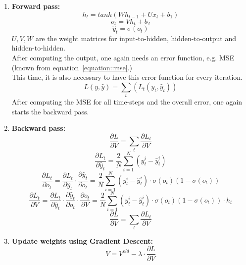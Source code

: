   \begin{enumerate}
   \item \textbf{Forward pass:}
   \begin{equation}
    h_t = tanh(Wh_{t-1} + Ux_t + b_1)
   \end{equation}
   \begin{equation}
    o_t = Vh_t + b_2
   \end{equation}
   \begin{equation}
    \hat{y}_t = \sigma(o_t)
   \end{equation}
   $U,V,W$ are the weight matrices for input-to-hidden, hidden-to-output and hidden-to-hidden.\\
   After computing the output, one again needs an error function, e.g. MSE (known from equation~\ref{equation::mse}.)\\
   This time, it is also necessary to have this error function for every iteration.
   \begin{equation}
    L(y, \hat{y}) = \sum_{t}(L_t(y_t, \hat{y}_t))
   \end{equation}
   After computing the MSE for all time-steps and the overall error, one again starts the backward pass.
   \item \textbf{Backward pass:}
   \begin{equation}
    \frac{\partial L}{\partial V} = \sum_t\frac{\partial L_t}{\partial V}
   \end{equation}
   \begin{equation}
    \frac{\partial L_t}{\partial \hat{y}_t} = \frac{2}{N}\sum_{i=1}^{N}(y_t^i-\hat{y}_t^i)
   \end{equation}
   \begin{equation}
    \frac{\partial L_t}{\partial o_t} = \frac{\partial L_t}{\partial \hat{y}_t} \cdot \frac{\partial \hat{y}_t}{\partial o_t} = \frac{2}{N}\sum_{i=1}^{N}(y_t^i-\hat{y}_t^i) \cdot \sigma(o_t)(1-
    \sigma(o_t))
   \end{equation}
   \begin{equation}
    \frac{\partial L_t}{\partial V} = \frac{\partial L_t}{\partial \hat{y}_t} \cdot \frac{\partial \hat{y}_t}{\partial o_t} \cdot \frac{\partial o_t}{\partial V} = \frac{2}{N}\sum_{i=1}^{N}(y_t^i-
    \hat{y}_t^i) \cdot \sigma(o_t)(1-\sigma(o_t)) \cdot h_t
   \end{equation}
   \begin{equation}
    \frac{\partial L}{\partial V} = \sum_t\frac{\partial L_t}{\partial V}
   \end{equation}
   \item \textbf{Update weights using Gradient Descent:}
   \begin{equation}
    V = V^{old} - \lambda \cdot \frac{\partial L}{\partial V}
   \end{equation}
  \end{enumerate}
